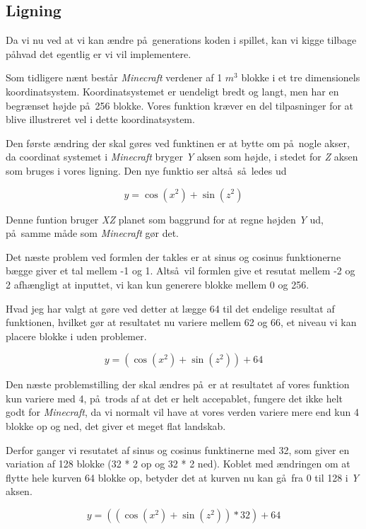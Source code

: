 \documentclass[a4paper,12pt]{report}
\begin{document}
		\subsection{Ligning}
		Da vi nu ved at vi kan \ae ndre p\aa \ generations koden i spillet, kan vi kigge tilbage p\aa hvad det egentlig er vi vil implementere.

		Som tidligere n\ae nt best\aa r \emph{Minecraft} verdener af 1 \(m^3\) blokke i et tre dimensionels koordinatsystem. Koordinatsystemet
		er uendeligt bredt og langt, men har en begr\ae nset h\o jde p\aa \ 256 blokke.
		Vores funktion kr\ae ver en del tilpasninger for at blive illustreret vel i dette koordinatsystem.

		Den f\o rste \ae ndring der skal g\o res ved funktinen er at bytte om p\aa \ nogle akser,
		da coordinat systemet i \emph{Minecraft} bryger \emph{Y} aksen som h\o jde, i stedet for \emph{Z} aksen som bruges
		i vores ligning. Den nye funktio ser alts\aa \ s\aa \ ledes ud

		\[y = \cos (x^2) + \sin (z^2)\]

		Denne funtion bruger \emph{XZ} planet som baggrund for at regne højden \emph{Y} ud,
		p\aa \ samme m\aa de som \emph{Minecraft} g\o r det.

		Det n\ae ste problem ved formlen der takles er at sinus og cosinus funktionerne b\ae gge giver et tal mellem -1 og 1.
		Alts\aa \ vil formlen give et resutat mellem -2 og 2 afh\ae ngligt at inputtet, vi kan kun generere blokke mellem
		0 og 256.

		Hvad jeg har valgt at g\o re ved detter at l\ae gge 64 til det endelige resultat af funktionen, hvilket g\o r at resultatet
		nu variere mellem 62 og 66, et niveau vi kan placere blokke i uden problemer.

		\[y = (\cos (x^2) + \sin (z^2)) + 64\]

		Den n\ae ste problemstilling der skal \ae ndres p\aa \ er at resultatet af vores funktion kun variere med 4, p\aa \
		trods af at det er helt accepablet, fungere det ikke helt godt for \emph{Minecraft}, da vi normalt vil have at vores verden
		variere mere end kun 4 blokke op og ned, det giver et meget flat landskab.

		Derfor ganger vi resutatet af sinus og cosinus funktinerne med 32, som giver en variation af 128 blokke (32 * 2 op og 32 * 2 ned).
		Koblet med \ae ndringen om at flytte hele kurven 64 blokke op, betyder det at kurven nu kan g\aa \ fra 0 til 128 i \emph{Y} aksen.

		\[y = ((\cos (x^2) + \sin (z^2)) * 32) + 64\]
\end{document}
